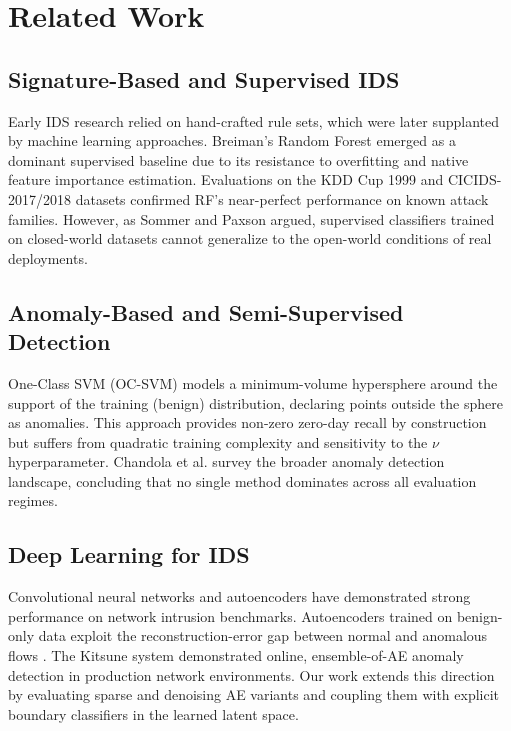 \documentclass[10pt,journal,compsoc]{IEEEtran}
\begin{document}
\section{Related Work}
\label{sec:related}

\subsection{Signature-Based and Supervised IDS}

Early IDS research relied on hand-crafted rule sets, which were later
supplanted by machine learning approaches.  Breiman's Random Forest
\cite{breiman2001} emerged as a dominant supervised baseline due to
its resistance to overfitting and native feature importance estimation.
Evaluations on the KDD Cup 1999 \cite{tavallaee2009nsl} and
CICIDS-2017/2018 \cite{sharafaldin2018} datasets confirmed RF's
near-perfect performance on known attack families.  However, as
Sommer and Paxson \cite{sommer2010outside} argued, supervised
classifiers trained on closed-world datasets cannot generalize to
the open-world conditions of real deployments.

\subsection{Anomaly-Based and Semi-Supervised Detection}

One-Class SVM (OC-SVM) \cite{scholkopf2001} models a minimum-volume
hypersphere around the support of the training (benign) distribution,
declaring points outside the sphere as anomalies.  This approach
provides non-zero zero-day recall by construction but suffers from
quadratic training complexity and sensitivity to the $\nu$
hyperparameter.  Chandola et al. \cite{chandola2009} survey the
broader anomaly detection landscape, concluding that no single method
dominates across all evaluation regimes.

\subsection{Deep Learning for IDS}

Convolutional neural networks \cite{kim2020cnn, sensors2023} and
autoencoders \cite{mirsky2018kitsune, vincent2010} have demonstrated
strong performance on network intrusion benchmarks.  Autoencoders
trained on benign-only data exploit the reconstruction-error gap
between normal and anomalous flows \cite{hinton2006}.  The Kitsune
system \cite{mirsky2018kitsune} demonstrated online, ensemble-of-AE
anomaly detection in production network environments.  Our work
extends this direction by evaluating sparse and denoising AE variants
and coupling them with explicit boundary classifiers in the learned
latent space.
\end{document}
